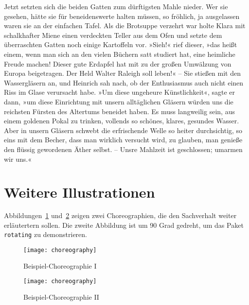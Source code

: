 Jetzt setzten sich die beiden Gatten zum dürftigsten Mahle nieder. Wer sie gesehen, hätte sie für beneidenswerte halten müssen, so fröhlich, ja ausgelassen waren sie an der einfachen Tafel. Als die Brotsuppe verzehrt war holte Klara mit schalkhafter Miene einen verdeckten Teller aus dem Ofen und setzte dem überraschten Gatten noch einige Kartoffeln vor. »Sieh!« rief dieser, »das heißt einem, wenn man sich an den vielen Büchern satt studiert hat, eine heimliche Freude machen! Dieser gute Erdapfel hat mit zu der großen Umwälzung von Europa beigetragen. Der Held Walter Raleigh soll leben!« – Sie stießen mit den Wassergläsern an, und Heinrich sah nach, ob der Enthusiasmus auch nicht einen Riss im Glase verursacht habe. »Um diese ungeheure Künstlichkeit«, sagte er dann, »um diese Einrichtung mit unsern alltäglichen Gläsern würden uns die reichsten Fürsten des Altertums beneidet haben. Es muss langweilig sein, aus einem goldenen Pokal zu trinken, vollends so schönes, klares, gesundes Wasser. Aber in unsern Gläsern schwebt die erfrischende Welle so heiter durchsichtig, so eins mit dem Becher, dass man wirklich versucht wird, zu glauben, man genieße den flüssig gewordenen Äther selbst. – Unsre Mahlzeit ist geschlossen; umarmen wir uns.«

\section{Weitere Illustrationen}
Abbildungen~\ref{fig:AnhangsChor} und~\ref{fig:AnhangsChor2} zeigen zwei Choreographien, die den
Sachverhalt weiter erläutertern sollen. Die zweite Abbildung ist um 90 Grad gedreht, um das Paket
\texttt{rotating} zu demonstrieren.

\begin{figure}
  \begin{center}
    \texttt{[image: choreography]}
    \caption{Beispiel-Choreographie I}
    \label{fig:AnhangsChor}
  \end{center}
\end{figure}

\begin{landscape}
\begin{figure}
  \begin{center}
    \texttt{[image: choreography]}
    \caption{Beispiel-Choreographie II}
    \label{fig:AnhangsChor2}
  \end{center}
\end{figure}
\end{landscape}
